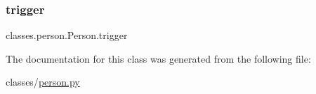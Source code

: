 \mbox{\label{classclasses_1_1person_1_1Person_a332b1802c61834e52a330635d83bd65b}} 
\subsubsection{\texorpdfstring{trigger}{trigger}}
{\footnotesize\ttfamily classes.\+person.\+Person.\+trigger}



The documentation for this class was generated from the following file\+:\begin{DoxyCompactItemize}
\item 
classes/\hyperlink{person_8py}{person.\+py}\end{DoxyCompactItemize}

